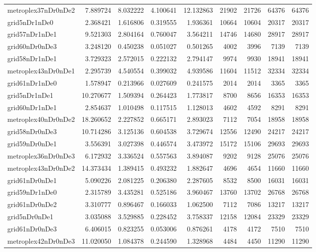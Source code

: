 \begin{longtable}{|l|r|r|r|r|r|r|r|r|}
metroplex37nDr0nDe2 & 7.889724 & 8.032222 & 4.100641 & 12.132863 & 21902 & 21726 & 64376 & 64376 \\
grid5nDr1nDe0 & 2.368421 & 1.616806 & 0.319555 & 1.936361 & 10664 & 10604 & 20317 & 20317 \\
grid57nDr1nDe1 & 9.521303 & 2.804164 & 0.760047 & 3.564211 & 14746 & 14680 & 28917 & 28917 \\
grid60nDr0nDe3 & 3.248120 & 0.450238 & 0.051027 & 0.501265 & 4002 & 3996 & 7139 & 7139 \\
grid58nDr1nDe1 & 3.729323 & 2.572015 & 0.222132 & 2.794147 & 9974 & 9930 & 18941 & 18941 \\
metroplex43nDr0nDe1 & 2.295739 & 4.540554 & 0.399032 & 4.939586 & 11604 & 11512 & 32334 & 32334 \\
grid61nDr1nDe0 & 1.578947 & 0.213966 & 0.027609 & 0.241575 & 2014 & 2014 & 3365 & 3365 \\
grid5nDr1nDe1 & 10.270677 & 1.509394 & 0.264423 & 1.773817 & 8700 & 8656 & 16353 & 16353 \\
grid60nDr1nDe1 & 2.854637 & 1.010498 & 0.117515 & 1.128013 & 4602 & 4592 & 8291 & 8291 \\
metroplex40nDr0nDe2 & 18.260652 & 2.227852 & 0.665171 & 2.893023 & 7112 & 7054 & 18958 & 18958 \\
grid58nDr0nDe3 & 10.714286 & 3.125136 & 0.604538 & 3.729674 & 12556 & 12490 & 24217 & 24217 \\
grid59nDr0nDe1 & 3.556391 & 3.027398 & 0.446574 & 3.473972 & 15172 & 15106 & 29693 & 29693 \\
metroplex36nDr0nDe3 & 6.172932 & 3.336524 & 0.557563 & 3.894087 & 9202 & 9128 & 25076 & 25076 \\
metroplex43nDr0nDe2 & 14.373434 & 1.389415 & 0.493232 & 1.882647 & 4696 & 4654 & 11660 & 11660 \\
grid61nDr0nDe1 & 5.090226 & 2.081225 & 0.206380 & 2.287605 & 8532 & 8500 & 16031 & 16031 \\
grid59nDr1nDe0 & 2.315789 & 3.435281 & 0.525186 & 3.960467 & 13760 & 13702 & 26768 & 26768 \\
grid61nDr0nDe2 & 3.310777 & 0.896467 & 0.166033 & 1.062500 & 7112 & 7086 & 13217 & 13217 \\
grid5nDr0nDe1 & 3.035088 & 3.529885 & 0.228452 & 3.758337 & 12158 & 12084 & 23329 & 23329 \\
grid61nDr0nDe3 & 6.406015 & 0.823255 & 0.053006 & 0.876261 & 4178 & 4172 & 7510 & 7510 \\
metroplex42nDr0nDe3 & 11.020050 & 1.084378 & 0.244590 & 1.328968 & 4484 & 4450 & 11290 & 11290 \\

\end{longtable}
